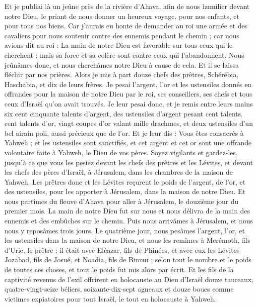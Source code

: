 \begin{multicols}{2}
Et je publiai là un jeûne près de la rivière d'Ahava, afin de nous humilier devant notre Dieu, le priant de nous donner un heureux voyage, pour nos enfants, et pour tous nos biens.
Car j'aurais eu honte de demander au roi une armée et des cavaliers pour nous soutenir contre des ennemis pendant le chemin ; car nous avions dit au roi : La main de notre Dieu est favorable sur tous ceux qui le cherchent ; mais sa force et sa colère sont contre ceux qui l'abandonnent.
Nous jeûnâmes donc, et nous cherchâmes notre Dieu à cause de cela. Et il se laissa fléchir par nos prières.
Alors je mis à part douze chefs des prêtres, Schérébia, Haschabia, et dix de leurs frères.
Je pesai l'argent, l'or et les ustensiles donnés en offrandes pour la maison de notre Dieu par le roi, ses conseillers, ses chefs et tous ceux d'Israël qu'on avait trouvés.
Je leur pesai donc, et je remis entre leurs mains six cent cinquante talents d'argent, des ustensiles d'argent pesant cent talents, cent talents d'or,
vingt coupes d'or valant mille drachmes, et deux ustensiles d'un bel airain poli, aussi précieux que de l'or.
Et je leur dis : Vous êtes consacrés à Yahweh ; et les ustensiles sont sanctifiés, et cet argent et cet or sont une offrande volontaire faite à Yahweh, le Dieu de vos pères.
Soyez vigilants et gardez-les, jusqu'à ce que vous les pesiez devant les chefs des prêtres et les Lévites, et devant les chefs des pères d'Israël, à Jérusalem, dans les chambres de la maison de Yahweh.
Les prêtres donc et les Lévites reçurent le poids de l'argent, de l'or, et des ustensiles, pour les apporter à Jérusalem, dans la maison de notre Dieu.
Et nous partîmes du fleuve d'Ahava pour aller à Jérusalem, le douzième jour du premier mois. La main de notre Dieu fut sur nous et nous délivra de la main des ennemis et des embûches sur le chemin.
Puis nous arrivâmes à Jérusalem, et nous nous y reposâmes trois jours.
Le quatrième jour, nous pesâmes l'argent, l'or, et les ustensiles dans la maison de notre Dieu, et nous les remîmes à Merémoth, fils d'Urie, le prêtre ; il était avec Eléazar, fils de Phinées, et avec eux les Lévites Jozabad, fils de Josué, et Noadia, fils de Binnuï ;
selon tout le nombre et le poids de toutes ces choses, et tout le poids fut mis alors par écrit.
Et les fils de la captivité revenus de l'exil offrirent en holocauste au Dieu d'Israël douze taureaux, quatre-vingt-seize béliers, soixante-dix-sept agneaux et douze boucs comme victimes expiatoires pour tout Israël, le tout en holocauste à Yahweh.

\end{multicols}
